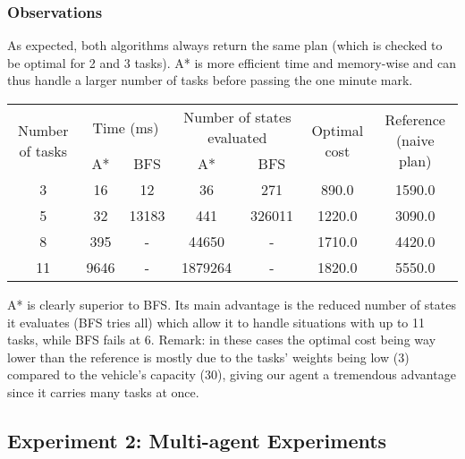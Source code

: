 \documentclass[11pt]{article}
\begin{document}
\subsubsection{Observations}
As expected, both algorithms always return the same plan (which is checked to be optimal for 2 and 3 tasks). A* is more efficient time and memory-wise and can thus handle a larger number of tasks before passing the one minute mark.

\begin{tabular}{|c|c|c|c|c|c|c|}
\hline
\multirow{2}{*}{Number of tasks} & \multicolumn{2}{c|}{Time (ms)} & \multicolumn{2}{c|}{Number of states evaluated} & \multirow{2}{*}{Optimal cost} & \multirow{2}{*}{Reference (naive plan)} \\ \cline{2-5}
                                 & A*          & BFS         & A*           & BFS          &                               &                                 \\ \hline
3                                &        16     &   12          &     36         &        271      &                              890.0 &      1590.0                           \\ \hline
5                                &     32        &     13183        &       441       &     326011         &                              1220.0 &               3090.0                  \\ \hline
8 &       395            &       -       &   44650 &  - &  1710.0 & 4420.0                          \\ \hline
11                                &       9646      &      -       &        1879264      &       -       &                              1820.0 &           5550.0                      \\ \hline
\end{tabular}

A* is clearly superior to BFS. Its main advantage is the reduced number of states it evaluates (BFS tries all) which allow it to handle situations with up to 11 tasks, while BFS fails at 6. Remark: in these cases the optimal cost being way lower than the reference is mostly due to the tasks' weights being low (3) compared to the vehicle's capacity (30), giving our agent a tremendous advantage since it carries many tasks at once. 

\subsection{Experiment 2: Multi-agent Experiments}
\end{document}
